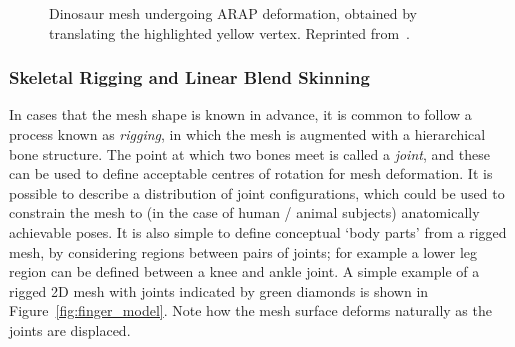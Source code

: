         \begin{figure}[H] %
            \caption{Dinosaur mesh undergoing ARAP deformation, obtained by translating the highlighted yellow vertex. Reprinted from~\cite{sorkine2007rigid}.}
            \label{fig:arap_dino}
        \end{figure}

        \subsubsection{Skeletal Rigging and Linear Blend Skinning}
        In cases that the mesh shape is known in advance, it is common to follow a process known as \textit{rigging}, in which the mesh is augmented with a hierarchical bone structure. The point at which two bones meet is called a \emph{joint}, and these can be used to define acceptable centres of rotation for mesh deformation. It is possible to describe a distribution of joint configurations, which could be used to constrain the mesh to (in the case of human / animal subjects) anatomically achievable poses. It is also simple to define conceptual `body parts' from a rigged mesh, by considering regions between pairs of joints; for example a lower leg region can be defined between a knee and ankle joint. A simple example of a rigged 2D mesh with joints indicated by green diamonds is shown in Figure~\ref{fig:finger_model}. Note how the mesh surface deforms naturally as the joints are displaced.
        

